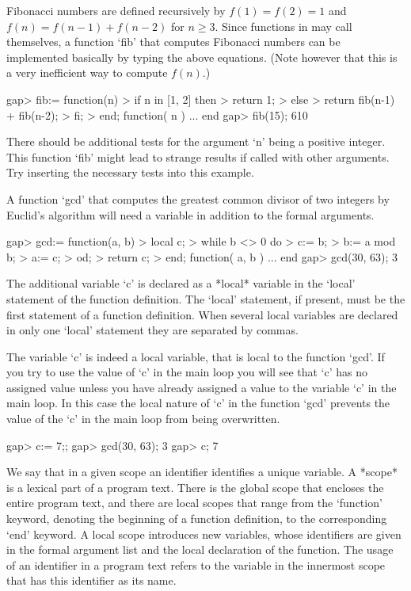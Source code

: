 Fibonacci numbers are defined recursively by $f(1) = f(2) =  1$ and
$f(n) =  f(n-1) + f(n-2)$ for $n \geq 3$.
Since functions in {\GAP} may call themselves,
a function `fib' that computes Fibonacci numbers can be implemented
basically by typing the above equations. (Note however that this is a very
inefficient way to compute $f(n)$.)

\beginexample
gap> fib:= function(n)
>       if n in [1, 2] then
>          return 1;
>       else
>          return fib(n-1) + fib(n-2);
>       fi;
>    end;
function( n ) ... end
gap> fib(15);
610
\endexample

There should be additional tests for the  argument  `n' being  a positive
integer.   This  function `fib' might  lead to strange  results if called
with other arguments.  Try inserting the necessary tests into this example.


A function `gcd' that computes the greatest common divisor of two
integers by Euclid's algorithm will need a variable in addition to the
formal arguments.

\beginexample
gap> gcd:= function(a, b)
>       local c;
>       while b <> 0 do
>          c:= b;
>          b:= a mod b;
>          a:= c;
>       od;
>       return c;
>    end;
function( a, b ) ... end
gap> gcd(30, 63);
3
\endexample

The additional  variable `c'  is declared as  a  *local*  variable in the
`local' statement  of the function definition.  The `local' statement, if
present, must  be the first  statement of  a function  definition.   When
several local variables are  declared in only one  `local' statement they
are separated by commas.                                 

The  variable `c'  is  indeed  a local  variable,  that  is local to  the
function `gcd'.  If you try  to use the value of `c' in the main loop you
will see that `c'  has no assigned value unless you have already assigned
a value to the variable `c'  in  the  main loop.  In this case  the local
nature of `c' in the function `gcd' prevents  the value of the `c' in the
main loop from being overwritten.

\beginexample
gap> c:= 7;;
gap> gcd(30, 63);
3
gap> c;
7
\endexample

We say  that in a given scope an identifier identifies a unique variable.
A *scope* is a lexical part of a program text.  There is the global scope
that encloses  the  entire program text, and there are local  scopes that
range from the `function'  keyword, denoting the beginning of  a function
definition, to the corresponding `end' keyword.  A local scope introduces
new  variables, whose identifiers are  given in the formal argument  list
and the local declaration of the function.  The usage of an identifier in
a program text refers to  the  variable in  the  innermost scope that has
this identifier as its name.

